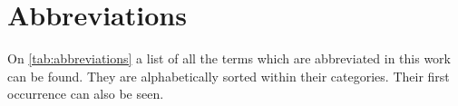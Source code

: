 \section{Abbreviations}
On \cref{tab:abbreviations} a list of all the terms which are abbreviated in this work can be found. They are alphabetically sorted within their categories. Their first occurrence can also be seen.
